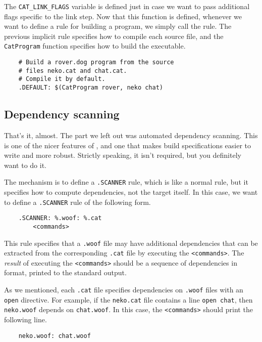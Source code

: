 The \verb+CAT_LINK_FLAGS+ variable is defined just in case we want to pass additional flags specific
to the link step.  Now that this function is defined, whenever we want to define a rule for building
a program, we simply call the rule.  The previous implicit rule specifies how to compile each source file,
and the \verb+CatProgram+ function specifies how to build the executable.

\begin{verbatim}
    # Build a rover.dog program from the source
    # files neko.cat and chat.cat.
    # Compile it by default.
    .DEFAULT: $(CatProgram rover, neko chat)
\end{verbatim}

\subsection{Dependency scanning}
\label{section:scanner-exm}

That's it, almost.  The part we left out was automated dependency scanning.  This is one of the
nicer features of \OMake{}, and one that makes build specifications easier to write and more robust.
Strictly speaking, it isn't required, but you definitely want to do it.

The mechanism is to define a \verb+.SCANNER+ rule, which is like a normal rule, but it specifies how
to compute dependencies, not the target itself.  In this case, we want to define a \verb+.SCANNER+
rule of the following form.

\begin{verbatim}
    .SCANNER: %.woof: %.cat
        <commands>
\end{verbatim}

This rule specifies that a \verb+.woof+ file may have additional dependencies that can be extracted
from the corresponding \verb+.cat+ file by executing the \verb+<commands>+.  The \emph{result} of
executing the \verb+<commands>+ should be a sequence of dependencies in \OMake{} format, printed to the
standard output.

As we mentioned, each \verb+.cat+ file specifies dependencies on \verb+.woof+ files with an
\verb+open+ directive.  For example, if the \verb+neko.cat+ file contains a line \verb+open chat+,
then \verb+neko.woof+ depends on \verb+chat.woof+.  In this case, the \verb+<commands>+ should print
the following line.

\begin{verbatim}
    neko.woof: chat.woof
\end{verbatim}

